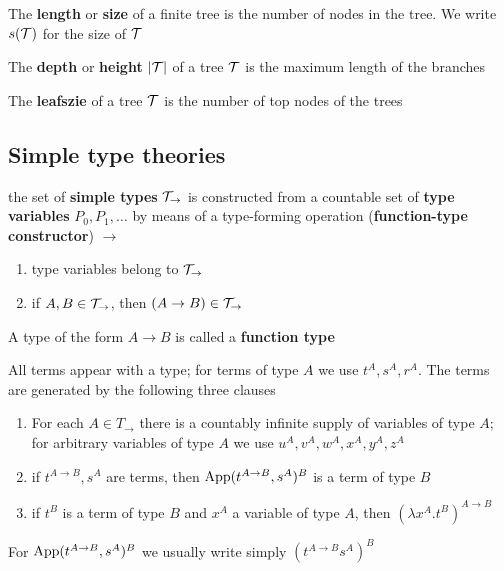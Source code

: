\documentclass[11pt]{article}
\begin{document}
\begin{definition}[]
The \textbf{length} or \textbf{size} of a finite tree is the number of nodes in the tree. We
write \(s(\mathcal{T})\) for the size of \(\mathcal{T}\)

The \textbf{depth} or \textbf{height} \(\abs{\calt}\) of a tree \(\mathcal{T}\) is the maximum
length of the branches

The \textbf{leafszie} of a tree \(\mathcal{T}\) is the number of top nodes of the trees
\end{definition}


\subsection{Simple type theories}
\label{sec:org7066fea}
\begin{definition}
the set of \textbf{simple types} \(\mathcal{T}_\to\) is constructed from a countable set
of \textbf{type variables} \(P_0,P_1,\dots\) by means of a type-forming operation
(\textbf{function-type constructor}) \(\to\)
\begin{enumerate}
\item type variables belong to \(\mathcal{T}_\to\)
\item if \(A,B\in\mathcal{T}_\to\), then \((A\to B)\in\mathcal{T}_\rightarrow\)
\end{enumerate}


A type of the form \(A\to B\) is called a \textbf{function type}
\end{definition}

\begin{definition}
\label{def1.2.2}
All terms appear with a type; for terms of type \(A\) we use \(t^A,s^A,r^A\). The
terms are generated by the following three clauses
\begin{enumerate}
\item For each \(A\in T_\to\) there is a countably infinite supply of variables of
type \(A\); for arbitrary variables of type \(A\) we use
\(u^A,v^A,w^A,x^A,y^A,z^A\)
\item if \(t^{A\to B},s^A\) are terms, then \(\text{App}(t^{A\to B},s^A)^B\) is a term of
type \(B\)
\item if \(t^B\) is a term of type \(B\) and \(x^A\) a variable of type \(A\), then
\((\lambda x^A.t^B)^{A\to B}\)
\end{enumerate}
\end{definition}
For \(\text{App}(t^{A\to B},s^A)^B\) we usually write simply \((t^{A\to B}s^A)^B\)
\end{document}
